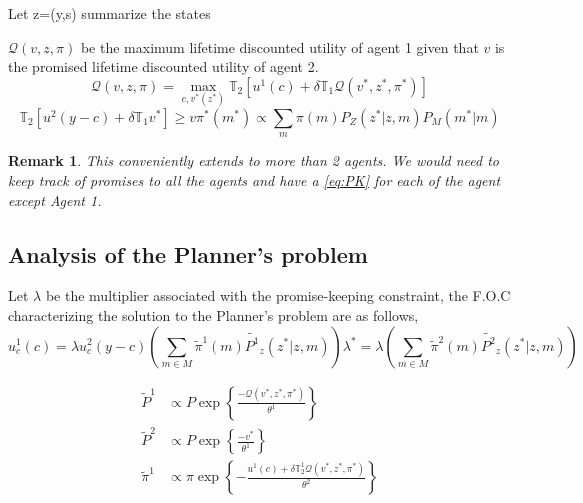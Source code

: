 \documentclass[12pt]{article}
\newtheorem{remark}{Remark}
\begin{document}
\noindent  Let z=(y,s) summarize the states

\noindent $\mathcal{Q}(v,z,\pi)$ be the maximum lifetime discounted utility of agent 1 given that $v$ is the promised lifetime discounted utility of agent 2.
\begin{equation}
\mathcal{Q}(v,z,\pi)=\max_{c,v^*(z^*)} \mathbb{T}_2\left[u^1(c)+\delta \mathbb{T}_1 \mathcal{Q}(v^*,z^*,\pi^*)\right]
\label{eq:PP}
\end{equation}
\begin{subequations}
\begin{equation}
\label{eq:PK}
\mathbb{T}_2\left[u^2(y-c)+\delta \mathbb{T}_1 v^*\right]\geq v
\end{equation}
\begin{equation}
\pi^{*}(m^*)\propto \sum_{m}{\pi(m) P_Z(z^*|z,m)P_M(m^{*}|m)}
\end{equation}
\end{subequations}
\begin{remark}
This conveniently extends to more than 2 agents. We would need to keep track of promises to all the agents and have a \ref{eq:PK} for each of the agent except Agent 1.
\end{remark}
\subsection{Analysis of the Planner's problem}
 Let $\lambda$ be the multiplier associated with the promise-keeping constraint, the F.O.C characterizing the solution to the Planner's problem are as follows,
 \begin{subequations}
\begin{equation}
u^1_c(c)=\lambda u^2_c(y-c)
\label{eq:FOC_c}
\end{equation}

\begin{equation}
\left(\sum_{m \in M}\tilde{\pi}^1(m)\tilde{P^1}_z(z^* |z,m)\right)\lambda^*=\lambda\left(\sum_{m \in M}\tilde{\pi}^2(m)\tilde{P^2}_z(z^* |z,m)\right) 
\label{eq:FOC_vstar}
\end{equation}
\end{subequations}

\begin{subequations}
\begin{align}
\tilde{P}^1 & \propto P\exp\left\{\frac{-\mathcal{Q}(v^*,z^*,\pi^*)}{\theta^1}\right\}\\
\tilde{P}^2 & \propto P\exp\left\{\frac{-v^*}{\theta^1}\right\}\\
\tilde{\pi}^1 & \propto \pi \exp\left\{-\frac{ u^1(c)+\delta \mathbb{T}^1_2 \mathcal{Q}(v^*,z^*,\pi^*) }{\theta^2}\right\} 
\end{align}
\end{subequations}
\end{document}

